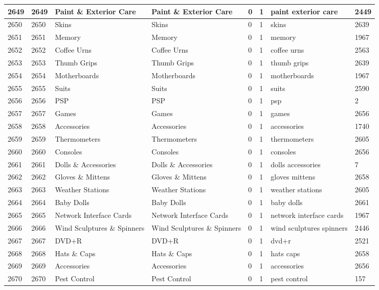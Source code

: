 \begin{longtable}{|l|l|l|l|l|l|l|l|}
2649 & 2649 & Paint \& Exterior Care & Paint \& Exterior Care & 0 & 1 & paint exterior care & 2449 \\ \hline 
2650 & 2650 & Skins & Skins & 0 & 1 & skins & 2639 \\ \hline 
2651 & 2651 & Memory & Memory & 0 & 1 & memory & 1967 \\ \hline 
2652 & 2652 & Coffee Urns & Coffee Urns & 0 & 1 & coffee urns & 2563 \\ \hline 
2653 & 2653 & Thumb Grips & Thumb Grips & 0 & 1 & thumb grips & 2639 \\ \hline 
2654 & 2654 & Motherboards & Motherboards & 0 & 1 & motherboards & 1967 \\ \hline 
2655 & 2655 & Suits & Suits & 0 & 1 & suits & 2590 \\ \hline 
2656 & 2656 & PSP & PSP & 0 & 1 & psp & 2 \\ \hline 
2657 & 2657 & Games & Games & 0 & 1 & games & 2656 \\ \hline 
2658 & 2658 & Accessories & Accessories & 0 & 1 & accessories & 1740 \\ \hline 
2659 & 2659 & Thermometers & Thermometers & 0 & 1 & thermometers & 2605 \\ \hline 
2660 & 2660 & Consoles & Consoles & 0 & 1 & consoles & 2656 \\ \hline 
2661 & 2661 & Dolls \& Accessories & Dolls \& Accessories & 0 & 1 & dolls accessories & 7 \\ \hline 
2662 & 2662 & Gloves \& Mittens & Gloves \& Mittens & 0 & 1 & gloves mittens & 2658 \\ \hline 
2663 & 2663 & Weather Stations & Weather Stations & 0 & 1 & weather stations & 2605 \\ \hline 
2664 & 2664 & Baby Dolls & Baby Dolls & 0 & 1 & baby dolls & 2661 \\ \hline 
2665 & 2665 & Network Interface Cards & Network Interface Cards & 0 & 1 & network interface cards & 1967 \\ \hline 
2666 & 2666 & Wind Sculptures \& Spinners & Wind Sculptures \& Spinners & 0 & 1 & wind sculptures spinners & 2446 \\ \hline 
2667 & 2667 & DVD+R & DVD+R & 0 & 1 & dvd+r & 2521 \\ \hline 
2668 & 2668 & Hats \& Caps & Hats \& Caps & 0 & 1 & hats caps & 2658 \\ \hline 
2669 & 2669 & Accessories & Accessories & 0 & 1 & accessories & 2656 \\ \hline 
2670 & 2670 & Pest Control & Pest Control & 0 & 1 & pest control & 157 \\ \hline 

\end{longtable}
